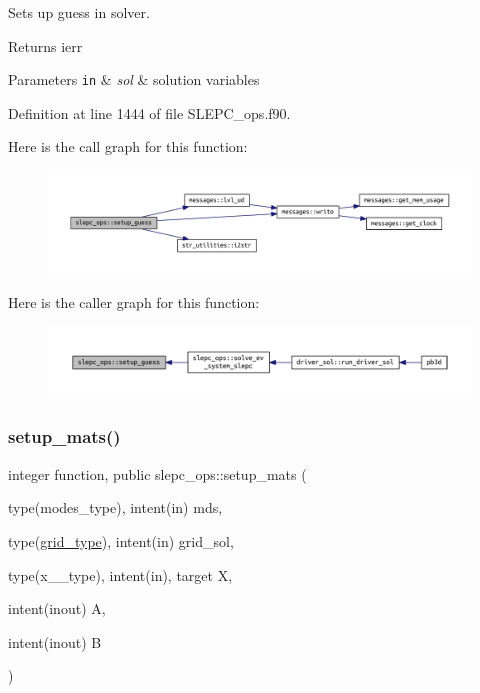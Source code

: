 Sets up guess in solver. 

\begin{DoxyReturn}{Returns}
ierr
\end{DoxyReturn}

\begin{DoxyParams}[1]{Parameters}
\mbox{\tt in}  & {\em sol} & solution variables \\
\hline
\end{DoxyParams}


Definition at line 1444 of file S\+L\+E\+P\+C\+\_\+ops.\+f90.

Here is the call graph for this function\+:\nopagebreak
\begin{figure}[H]
\begin{center}
\leavevmode
\includegraphics[width=350pt]{namespaceslepc__ops_a17a57b58ac6ca48ff4bdb44e8689bb19_cgraph}
\end{center}
\end{figure}
Here is the caller graph for this function\+:\nopagebreak
\begin{figure}[H]
\begin{center}
\leavevmode
\includegraphics[width=350pt]{namespaceslepc__ops_a17a57b58ac6ca48ff4bdb44e8689bb19_icgraph}
\end{center}
\end{figure}
\mbox{\label{namespaceslepc__ops_aac8202cb74cbb06013eb73f1fa0c3118}} 
\subsubsection{\texorpdfstring{setup\+\_\+mats()}{setup\_mats()}}
{\footnotesize\ttfamily integer function, public slepc\+\_\+ops\+::setup\+\_\+mats (\begin{DoxyParamCaption}\item[{type(modes\+\_\+type), intent(in)}]{mds,  }\item[{type(\hyperlink{structgrid__vars_1_1grid__type}{grid\+\_\+type}), intent(in)}]{grid\+\_\+sol,  }\item[{type(x\+\_\+2\+\_\+type), intent(in), target}]{X,  }\item[{intent(inout)}]{A,  }\item[{intent(inout)}]{B }\end{DoxyParamCaption})}



